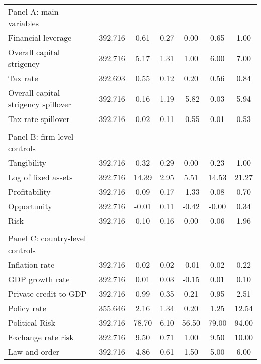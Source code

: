 \begin{longtable}{lcccccc}
	Panel A: main variables         &      &        &        &        &       \\
\quad Financial leverage  &      392.716&        0.61&        0.27&        0.00&        0.65&        1.00\\
\quad Overall capital strigency&      392.716&        5.17&        1.31&        1.00&        6.00&        7.00\\
\quad Tax rate            &      392.693&        0.55&        0.12&        0.20&        0.56&        0.84\\
\quad Overall capital strigency spillover&      392.716&        0.16&        1.19&       -5.82&        0.03&        5.94\\
\quad Tax rate spillover  &      392.716&        0.02&        0.11&       -0.55&        0.01&        0.53\\
          &      &        &        &        &       \\
Panel B: firm-level controls         &      &        &        &        &       \\
\quad Tangibility         &      392.716&        0.32&        0.29&        0.00&        0.23&        1.00\\
\quad Log of fixed assets &      392.716&       14.39&        2.95&        5.51&       14.53&       21.27\\
\quad Profitability       &      392.716&        0.09&        0.17&       -1.33&        0.08&        0.70\\
\quad Opportunity         &      392.716&       -0.01&        0.11&       -0.42&       -0.00&        0.34\\
\quad Risk                &      392.716&        0.10&        0.16&        0.00&        0.06&        1.96\\
         &      &        &        &        &       \\
Panel C: country-level controls         &      &        &        &        &       \\
\quad Inflation rate      &      392.716&        0.02&        0.02&       -0.01&        0.02&        0.22\\
\quad GDP growth rate     &      392.716&        0.01&        0.03&       -0.15&        0.01&        0.10\\
\quad Private credit to GDP&      392.716&        0.99&        0.35&        0.21&        0.95&        2.51\\
\quad Policy rate         &      355.646&        2.16&        1.34&        0.20&        1.25&       12.54\\
\quad Political Risk      &      392.716&       78.70&        6.10&       56.50&       79.00&       94.00\\
\quad Exchange rate risk  &      392.716&        9.50&        0.71&        1.00&        9.50&       10.00\\
\quad Law and order       &      392.716&        4.86&        0.61&        1.50&        5.00&        6.00\\
\hline\end{longtable}